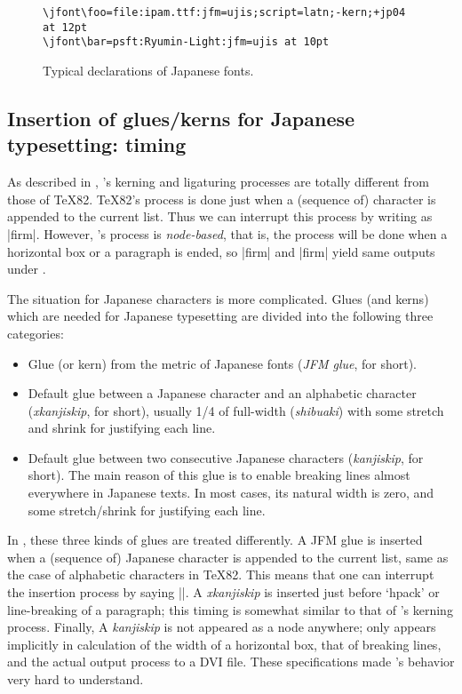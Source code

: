 \documentclass{ajt}
\begin{document}
\begin{figure}
\begin{verbatim}
\jfont\foo=file:ipam.ttf:jfm=ujis;script=latn;-kern;+jp04 at 12pt
\jfont\bar=psft:Ryumin-Light:jfm=ujis at 10pt
\end{verbatim}
\caption{Typical declarations of Japanese fonts.}
\label{fig-jfdef}
\end{figure}

\subsection{Insertion of glues/kerns for Japanese typesetting: timing}
\label{ssec-jglue}

As described in \cite{luatexref}, \LuaTeX's kerning and ligaturing
processes are totally different from those of \TeX82.  \TeX82's process is
done just when a (sequence of) character is appended to the current
list. Thus we can interrupt this process by writing as
|f{}irm|. However, \LuaTeX's process is \emph{node-based}, that is, the
process will be done when a horizontal box or a paragraph is ended, so
|f{}irm| and |firm| yield  same outputs under \LuaTeX.

The situation for Japanese characters is more complicated.
Glues (and kerns) which are needed for Japanese
typesetting are divided into the following three categories:
\begin{itemize}
\item Glue (or kern) from the metric of Japanese fonts (\emph{JFM glue},
      for short). 

\item Default glue between a Japanese character and an alphabetic
      character (\emph{xkanjiskip}, for short), usually 1/4 of
      full-width (\emph{shibuaki}) with some stretch and shrink for
      justifying each line.
\item Default glue between two consecutive Japanese characters
      (\emph{kanjiskip}, for short). The main reason of this glue is to
      enable breaking lines almost everywhere in Japanese texts. In most
      cases, its natural width is zero, and some stretch/shrink for
      justifying each line.
\end{itemize}
In \pTeX, these three kinds of glues are treated differently. A JFM glue
is inserted when a (sequence of) Japanese character is appended to the
current list, same as the case of alphabetic characters in \TeX82. This
means that one can interrupt the insertion process by saying |{}|.  A
\emph{xkanjiskip} is inserted just before `hpack' or line-breaking of a
paragraph; this timing is somewhat similar to that of \LuaTeX's kerning
process. Finally, A \emph{kanjiskip} is not appeared as a node anywhere;
only appears implicitly in calculation of the width of a horizontal box,
that of breaking lines, and the actual output process to a DVI
file. These specifications made \pTeX's behavior very hard to
understand.
\end{document}
